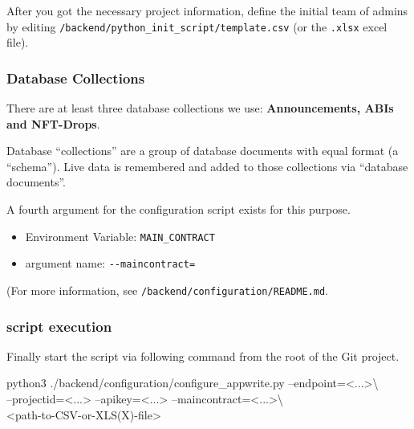 \documentclass[
]{article}
\newenvironment{Shaded}{}{}
\newcommand{\ExtensionTok}[1]{#1}
\newcommand{\NormalTok}[1]{#1}
\newcommand{\OperatorTok}[1]{\textcolor[rgb]{0.40,0.40,0.40}{#1}}
\providecommand{\tightlist}{%
  \setlength{\itemsep}{0pt}\setlength{\parskip}{0pt}}
\begin{document}
After you got the necessary project information, define the initial team
of admins by editing \texttt{/backend/python\_init\_script/template.csv}
(or the \texttt{.xlsx} excel file).

\hypertarget{database-collections}{%
\subsubsection{Database Collections}\label{database-collections}}

There are at least three database collections we use:
\textbf{Announcements, ABIs and NFT-Drops}.

Database ``collections'' are a group of database documents with equal
format (a ``schema''). Live data is remembered and added to those
collections via ``database documents''.

A fourth argument for the configuration script exists for this purpose.

\begin{itemize}
\tightlist
\item
  Environment Variable: \texttt{MAIN\_CONTRACT}
\item
  argument name: \texttt{-\/-maincontract=}
\end{itemize}

(For more information, see \texttt{/backend/configuration/README.md}.

\hypertarget{script-execution}{%
\subsubsection{script execution}\label{script-execution}}

Finally start the script via following command from the root of the Git
project.

\begin{Shaded}
\begin{Highlighting}[]
\ExtensionTok{python3}\NormalTok{ ./backend/configuration/configure_appwrite.py --endpoint=}\OperatorTok{<}\NormalTok{...}\OperatorTok{>}\backslash{}\\
\NormalTok{ --projectid=}\OperatorTok{<}\NormalTok{...}\OperatorTok{>}\NormalTok{ --apikey=}\OperatorTok{<}\NormalTok{...}\OperatorTok{>}\NormalTok{  --maincontract=}\OperatorTok{<}\NormalTok{...}\OperatorTok{>}\backslash{}\\
\OperatorTok{<}\NormalTok{path-to-CSV-or-XLS(X)}\ExtensionTok{-file}\OperatorTok{>}
\end{Highlighting}
\end{Shaded}
\end{document}
